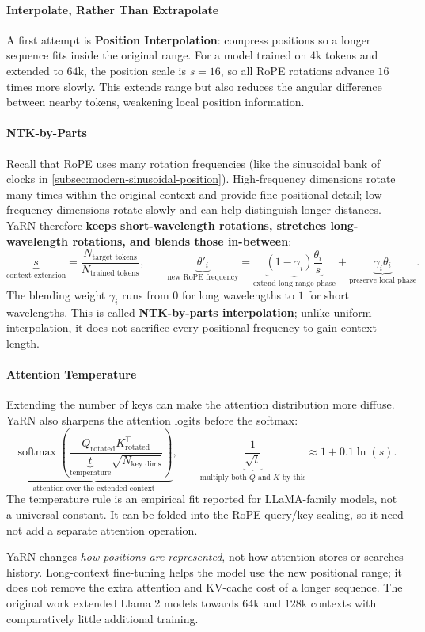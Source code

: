 \paragraph{Interpolate, Rather Than Extrapolate}
A first attempt is \textbf{Position Interpolation}: compress positions so a longer sequence fits inside the original range.
For a model trained on $4\mathrm{k}$ tokens and extended to $64\mathrm{k}$, the position scale is $s=16$, so all RoPE rotations advance $16$ times more slowly.
This extends range but also reduces the angular difference between nearby tokens, weakening local position information.

\paragraph{NTK-by-Parts}
Recall that RoPE uses many rotation frequencies (like the sinusoidal bank of clocks in \cref{subsec:modern-sinusoidal-position}).
High-frequency dimensions rotate many times within the original context and provide fine positional detail; low-frequency dimensions rotate slowly and can help distinguish longer distances.
YaRN therefore \textbf{keeps short-wavelength rotations, stretches long-wavelength rotations, and blends those in-between}:
\[
    \underbrace{s}_{\text{context extension}}
    =\frac{N_{\text{target tokens}}}{N_{\text{trained tokens}}},
    \qquad
    \underbrace{\theta'_i}_{\text{new RoPE frequency}}
    =\underbrace{(1-\gamma_i)\frac{\theta_i}{s}}_{\text{extend long-range phase}}
    +\underbrace{\gamma_i\theta_i}_{\text{preserve local phase}}.
\]
The blending weight $\gamma_i$ runs from $0$ for long wavelengths to $1$ for short wavelengths.
This is called \textbf{NTK-by-parts interpolation}; unlike uniform interpolation, it does not sacrifice every positional frequency to gain context length.

\paragraph{Attention Temperature}
Extending the number of keys can make the attention distribution more diffuse.
YaRN also sharpens the attention logits before the softmax:
\[
    \underbrace{\operatorname{softmax}\!\left(
    \frac{Q_{\text{rotated}}K_{\text{rotated}}^\top}
    {\underbrace{t}_{\text{temperature}}\sqrt{N_{\text{key dims}}}}
    \right)}_{\text{attention over the extended context}},
    \qquad
    \underbrace{\frac{1}{\sqrt{t}}}_{\text{multiply both $Q$ and $K$ by this}}
    \approx 1+0.1\ln(s).
\]
The temperature rule is an empirical fit reported for LLaMA-family models, not a universal constant.
It can be folded into the RoPE query/key scaling, so it need not add a separate attention operation.

YaRN changes \textit{how positions are represented}, not how attention stores or searches history.
Long-context fine-tuning helps the model use the new positional range; it does not remove the extra attention and KV-cache cost of a longer sequence.
The original work extended Llama 2 models towards $64\mathrm{k}$ and $128\mathrm{k}$ contexts with comparatively little additional training.


